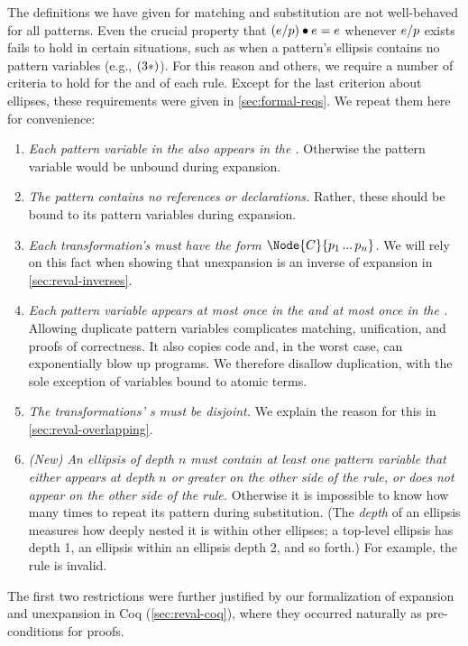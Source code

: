 The definitions we have given for matching and substitution are not
well-behaved for all patterns. Even the crucial property that
$(e / p) \bullet e = e$ whenever $e / p$ exists fails to hold in certain
situations, such as when a pattern's ellipsis contains no pattern variables (e.g.,
$(3*)$). For this reason and others, we require a number of criteria
to hold for the  and  of each rule. Except for the
last criterion about ellipses, these requirements were given in
\cref{sec:formal-reqs}. We repeat them here for convenience:
\begin{enumerate}
\item \emph{Each pattern variable in the  also appears in the
  .} Otherwise the pattern variable would be unbound during
  expansion.
\item \emph{The  pattern contains no references or declarations.} Rather, these
  should be bound to its pattern variables during expansion.
\item \emph{Each transformation's  must have the form
  $\Node{C}{p_1 \dd p_n}$.} We will rely on this fact when showing that
  unexpansion is an inverse of expansion in \cref{sec:reval-inverses}.
\item \emph{Each pattern variable appears at most once in the  and at
  most once in the .}
  Allowing duplicate pattern variables complicates matching, unification,
  and proofs of correctness. It also copies code
  and, in the worst case, can exponentially blow up programs.
  We therefore disallow duplication,
  with the sole exception of variables bound to atomic terms.
\item \emph{The transformations' s must be disjoint.} We
  explain the reason for this in \cref{sec:reval-overlapping}.
\item \emph{(New) An ellipsis of depth $n$ must contain at least one pattern variable
  that either appears at depth $n$ or greater on the other side of the
  rule, or does not appear on the other side of the rule.} Otherwise it is
  impossible to know how many times to repeat its pattern during
  substitution. (The \emph{depth} of an ellipsis measures how deeply nested
  it is within other ellipses; a top-level ellipsis has depth 1, an
  ellipsis within an ellipsis depth 2, and so forth.) For example,
  the rule  is invalid.
\end{enumerate}
The first two restrictions were further justified by our formalization of
expansion and unexpansion in Coq (\cref{sec:reval-coq}), 
where they occurred naturally as pre-conditions
for proofs.

